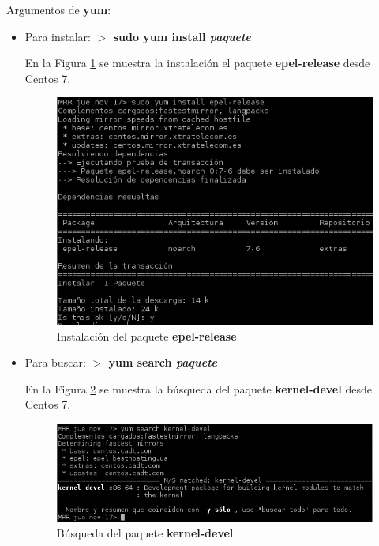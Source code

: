 Argumentos de \textbf{yum}\cite{enlace5}:
\begin{itemize}
	\item Para instalar: \textbf{$ > $ sudo yum install \textit{paquete}}
	
	En la Figura \ref{fig:figura1} se muestra la instalación el paquete \textbf{epel-release} desde Centos 7.
	\begin{figure}[H] %
		\centering
		\includegraphics[scale=0.7]{figuras/figura1.png} 
		\caption{Instalación del paquete \textbf{epel-release}} 
		\label{fig:figura1}
	\end{figure}
	
	\item Para buscar: \textbf{$ > $ yum search \textit{paquete}}
	
	En la Figura \ref{fig:figura3} se muestra la búsqueda del paquete \textbf{kernel-devel} desde Centos 7.
	\begin{figure}[H] %
		\centering
		\includegraphics[scale=0.7]{figuras/figura3.png} 
		\caption{Búsqueda del paquete \textbf{kernel-devel}} 
		\label{fig:figura3}
	\end{figure}


\end{itemize}
